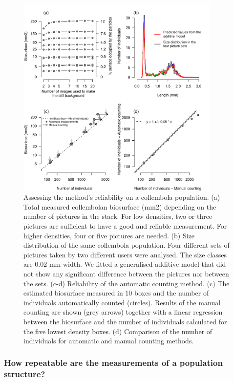 \begin{figure}[!ht] %
\centering
\includegraphics[width=0.90\textwidth]{2_Methodo/Fig/6_Plugin_multiP.pdf}
\caption[  Assessing the method's reliability on a collembola population]{ Assessing the method's reliability on a collembola population. (a) Total measured collembolan biosurface (mm2) depending on the number of pictures
in the stack. For low densities, two or three pictures are sufficient to have a
good and reliable measurement. For higher densities, four or five pictures are
needed. (b) Size distribution of the same collembola population. Four different
sets of pictures taken by two different users were analysed. The size classes
are 0.02 mm width. We fitted a generalised additive model that did not show any
significant difference between the pictures nor between the sets. (c-d)
Reliability of the automatic counting method. (c) The estimated biosurface
measured in 10 boxes and the number of individuals automatically counted
(circles). Results of the manual counting are shown (grey arrows) together with
a linear regression between the biosurface and the number of individuals
calculated for the five lowest density boxes. (d) Comparison of the number of
individuals for automatic and manual counting methods.
}
\label{Fig21-6}
\end{figure}

\subsubsection{How repeatable are the measurements of a population structure?}

